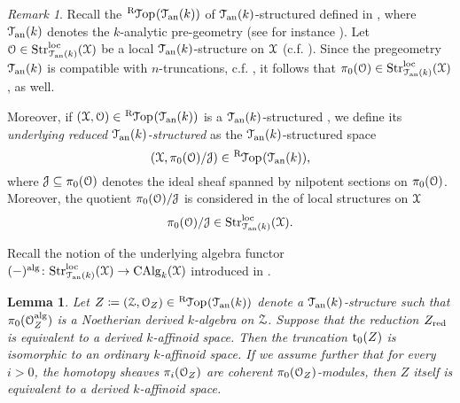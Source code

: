 \documentclass[10pt,a4paper,reqno]{amsart} %
\theoremstyle{plain}
\newtheorem{lem}[thm]{Lemma}
\theoremstyle{definition}
\theoremstyle{remark}
\newtheorem{rem}[thm]{Remark}
\numberwithin{equation}{section}
\begin{document}
\begin{rem}
    Recall the \infcat $\RTop(\cTank)$ of $\mathcal T_{\mathrm{an}}(k)$-structured \inftopoi defined in
    \cite[Definition 2.4]{Porta_Yu_Derived_non-archimedean_analytic_spaces}, where $\mathcal T_{\mathrm{an}}(k)$ denotes the $k$-analytic pre-geometry (see for instance \cite[Construction 2.2]{Porta_Yu_Derived_non-archimedean_analytic_spaces}).
    Let  $\mathcal O \in \mathrm{Str}^\mathrm{loc}_{\mathcal T_{\mathrm{an}}(k)}(\mathcal X)$ be a local $\mathcal T_{\mathrm{an}}(k)$-structure on $\mathcal X$ (c.f. \cite[Definition 2.4]{Porta_Yu_Derived_non-archimedean_analytic_spaces}). Since the pregeometry $\mathcal T_{\mathrm{an}}(k)$ is compatible
    with $n$-truncations, c.f. \cite[Theorem 3.23]{Porta_Yu_Derived_non-archimedean_analytic_spaces}, it follows that
    $\pi_0(\mathcal O) \in \mathrm{Str}^\mathrm{loc}_{\mathcal T_{\mathrm{an}}(k)}(\mathcal X)$, as well.
    
    Moreover, if $(\cX, \cO) \in \RTop(\cTank)$ is a $\mathcal T_{\mathrm{an}}(k)$-structured \inftopos, we define its \emph{underlying reduced $\mathcal T_{\mathrm{an}}(k)$-structured \inftopos} as the $\mathcal T_{\mathrm{an}}(k)$-structured space
        \[  
            (\cX, \pi_0(\cO)/ \cJ) \in \RTop(\cTank),  
        \]
    where $\mathcal J \subseteq \pi_0(\mathcal O)$ denotes the ideal sheaf spanned by nilpotent sections on $\pi_0(\mathcal O)$. Moreover, the quotient $\pi_0(\mathcal O)/ \mathcal J$
    is considered in the \infcat of local structures on $\mathcal X$
        \[
            \pi_0(\mathcal O) / \mathcal J \in \mathrm{Str}^\mathrm{loc}_{\mathcal T_{\mathrm{an}}(k)}(\mathcal X).
        \]
\end{rem}

Recall the notion of the underlying algebra functor $(-)^\mathrm{alg} \colon \mathrm{Str}^\mathrm{loc}_{\mathcal T_{\mathrm{an}}(k)}(\mathcal X) \to \mathrm{CAlg}_k(\mathcal X)$ introduced in
\cite[Lemma 3.13]{Porta_Yu_Derived_non-archimedean_analytic_spaces}.

\begin{lem} \label{lem:derived_k_analytic_space_whose_reduction_is_affinoid_is_also_affinoid}
    Let $Z \coloneqq (\cZ, \cO_Z) \in \RTop(\cTank)$ denote a $\mathcal T_{\mathrm{an}}(k)$-structure \inftopos such that $\pi_0(\mathcal O_Z^\mathrm{alg}) $ is a Noetherian derived $k$-algebra on $\mathcal Z$.
    Suppose that the reduction
    $Z_{\mathrm{red}}$ is equivalent to a derived $k$-affinoid space. Then the truncation $\mathrm{t}_0(Z)$ is isomorphic to an ordinary $k$-affinoid space.
    If we assume further that for every $i>0$, the homotopy sheaves $\pi_i(\mathcal O_Z)$ are
    coherent $\pi_0(\mathcal O_Z)$-modules, then $Z$ itself is equivalent to a derived $k$-affinoid space.
\end{lem}
\end{document}
